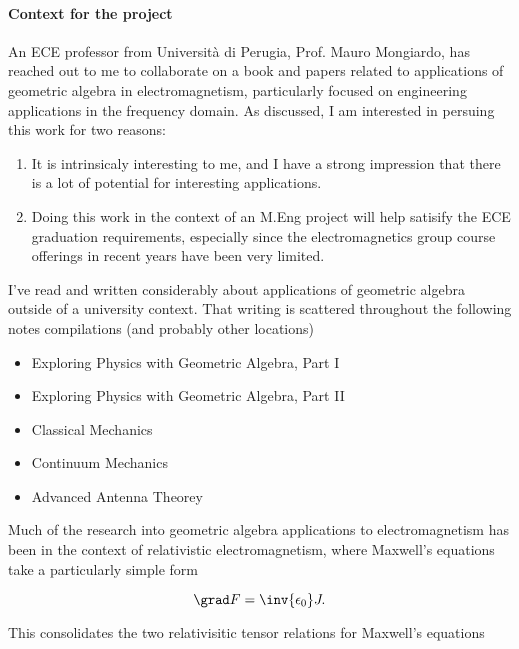 \paragraph{Context for the project}

An ECE professor from Università di Perugia, Prof. Mauro Mongiardo, has reached out to me to collaborate on a book and papers related to applications of geometric algebra in electromagnetism, particularly focused on engineering applications in the frequency domain.  As discussed, I am interested in persuing this work for two reasons:

\begin{enumerate}
\item
It is intrinsicaly interesting to me, and I have a strong impression that there is a lot of potential for interesting applications.
\item
Doing this work in the context of an M.Eng project will help satisify the ECE graduation requirements, especially since the electromagnetics group course offerings in recent years have been very limited.
\end{enumerate}

I've read and written considerably about applications of geometric algebra outside of a university context.  That writing is scattered throughout the following notes compilations (and probably other locations)

\begin{itemize}
\item Exploring Physics with Geometric Algebra, Part I \citep{gabookI}
\item Exploring Physics with Geometric Algebra, Part II \citep{gabookII}
\item Classical Mechanics \citep{classicalmechanics}
\item Continuum Mechanics \citep{phy454}
\item Advanced Antenna Theorey \citep{ece1229}
\end{itemize}

Much of the research into geometric algebra applications to electromagnetism has been in the context of relativistic electromagnetism, where Maxwell's equations take a particularly simple form

\begin{dmath}\label{eqn:syllabusAndContext:n}
\grad F = \inv{\epsilon_0} J.
\end{dmath}

This consolidates the two relativisitic tensor relations for Maxwell's equations

